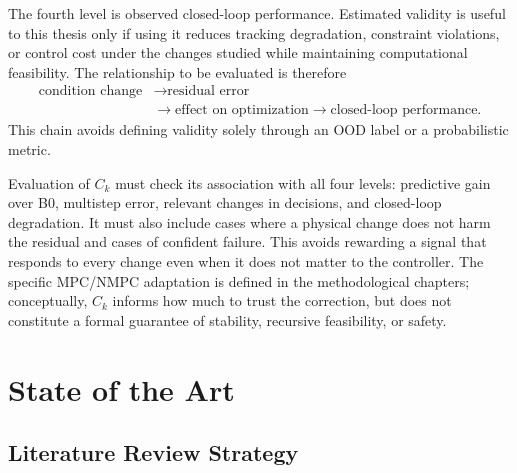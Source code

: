 \documentclass[12pt,a4paper]{report}
\begin{document}
The fourth level is observed closed-loop performance. Estimated validity is useful to this thesis only if using it reduces tracking degradation, constraint violations, or control cost under the changes studied while maintaining computational feasibility. The relationship to be evaluated is therefore
\begin{equation}
    \begin{aligned}
        \text{condition change}
        &\longrightarrow
        \text{residual error} \\
        &\longrightarrow
        \text{effect on optimization}
        \longrightarrow
        \text{closed-loop performance}.
    \end{aligned}
    \label{eq:validity_control_relevance_chain}
\end{equation}
This chain avoids defining validity solely through an OOD label or a probabilistic metric.

Evaluation of $C_k$ must check its association with all four levels: predictive gain over B0, multistep error, relevant changes in decisions, and closed-loop degradation. It must also include cases where a physical change does not harm the residual and cases of confident failure. This avoids rewarding a signal that responds to every change even when it does not matter to the controller. The specific MPC/NMPC adaptation is defined in the methodological chapters; conceptually, $C_k$ informs how much to trust the correction, but does not constitute a formal guarantee of stability, recursive feasibility, or safety.



\chapter{State of the Art}

\section{Literature Review Strategy}

%
\end{document}
